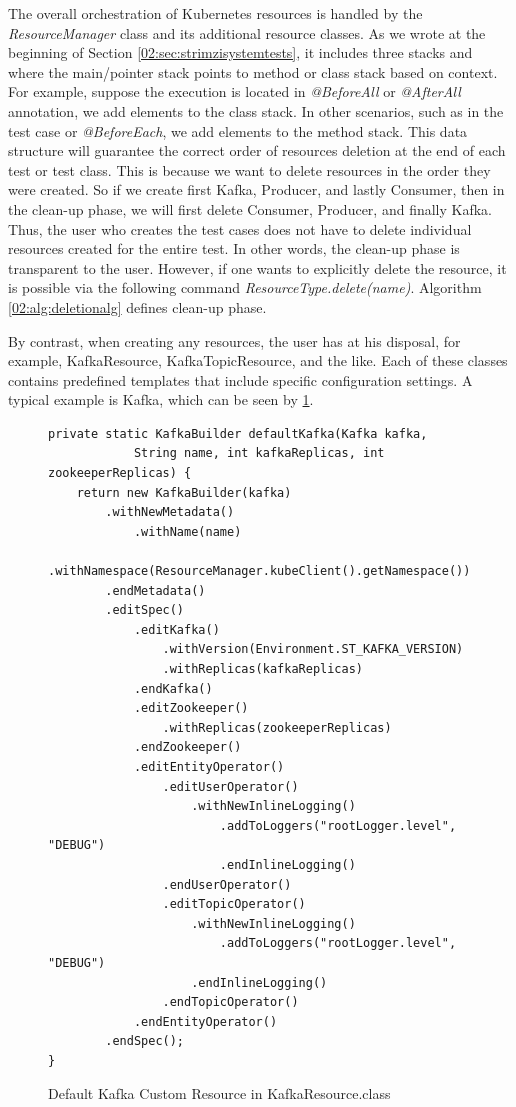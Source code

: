 The overall orchestration of Kubernetes resources is handled by the \emph{ResourceManager} class and its additional resource classes. As we wrote at the beginning of Section \ref{02:sec:strimzisystemtests}, it includes three stacks and where the main/pointer stack points to method or class stack based on context. For example, suppose the execution is located in \emph{@BeforeAll} or \emph{@AfterAll} annotation, we add elements to the class stack. In other scenarios, such as in the test case or \emph{@BeforeEach}, we add elements to the method stack. This data structure will guarantee the correct order of resources deletion at the end of each test or test class. This is because we want to delete resources in the order they were created. So if we create first Kafka, Producer, and lastly Consumer, then in the clean-up phase, we will first delete Consumer, Producer, and finally Kafka. Thus, the user who creates the test cases does not have to delete individual resources created for the entire test. In other words, the clean-up phase is transparent to the user. However, if one wants to explicitly delete the resource, it is possible via the following command \emph{ResourceType.delete(name)}. Algorithm \ref{02:alg:deletionalg} defines clean-up phase.


By contrast, when creating any resources, the user has at his disposal, for example, KafkaResource, KafkaTopicResource, and the like. Each of these classes contains predefined templates that include specific configuration settings. A typical example is Kafka, which can be seen by \ref{02:fig:kafkaresource:defaultmethod}.

\begin{figure}[!ht]
\begin{lstlisting}
private static KafkaBuilder defaultKafka(Kafka kafka,
            String name, int kafkaReplicas, int zookeeperReplicas) {
    return new KafkaBuilder(kafka)
        .withNewMetadata()
            .withName(name)
            .withNamespace(ResourceManager.kubeClient().getNamespace())
        .endMetadata()
        .editSpec()
            .editKafka()
                .withVersion(Environment.ST_KAFKA_VERSION)
                .withReplicas(kafkaReplicas)
            .endKafka()
            .editZookeeper()
                .withReplicas(zookeeperReplicas)
            .endZookeeper()
            .editEntityOperator()
                .editUserOperator()
                    .withNewInlineLogging()
                        .addToLoggers("rootLogger.level", "DEBUG")
                        .endInlineLogging()
                .endUserOperator()
                .editTopicOperator()
                    .withNewInlineLogging()
                        .addToLoggers("rootLogger.level", "DEBUG")
                    .endInlineLogging()
                .endTopicOperator()
            .endEntityOperator()
        .endSpec();
}
\end{lstlisting}
    \caption{Default Kafka Custom Resource in KafkaResource.class}
    \label{02:fig:kafkaresource:defaultmethod}
\end{figure}

